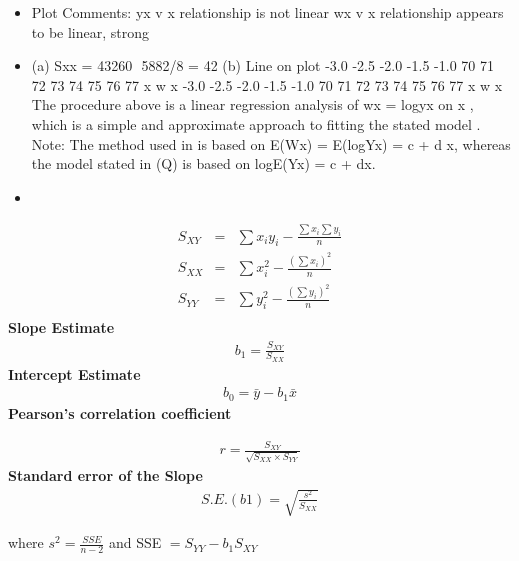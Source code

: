 \documentclass[a4paper,12pt]{article}
\begin{document}
\begin{itemize}
\item Plot
Comments: yx v x relationship is not linear
wx v x relationship appears to be linear, strong
\item (a) Sxx = 43260  5882/8 = 42
(b) Line on plot
-3.0
-2.5
-2.0
-1.5
-1.0
70 71 72 73 74 75 76 77
x
w x
-3.0
-2.5
-2.0
-1.5
-1.0
70 71 72 73 74 75 76 77
x
w x
The procedure above is a linear regression analysis of wx = logyx on x , which
is a simple and approximate approach to fitting the stated model .
Note: The method used in  is based on E(Wx) = E(logYx) = c + d x, whereas
the model stated in (Q) is based on logE(Yx) = c + dx.
    \item 
\end{itemize}


\newpage


\begin{eqnarray*}
	S_{XY} &=&
	\sum x_iy_i - \frac{\sum x_i\sum y_i}{n}\\
	S_{XX} &=&
	\sum x_i^2 - \frac{(\sum x_i)^2}{n}\\
	S_{YY} &=&
	\sum y_i^2 - \frac{(\sum y_i)^2}{n}\\
\end{eqnarray*}
{\bf Slope Estimate}
\begin{eqnarray*}
	b_1 = \frac{S_{XY}}{S_{XX}}
\end{eqnarray*}
{\bf Intercept Estimate}
\begin{eqnarray*}
	b_0 = \bar{y} -b_1\bar{x}
\end{eqnarray*}
{\bf Pearson's correlation coefficient}

\begin{eqnarray*}
	r = \frac{S_{XY}}{\sqrt{S_{XX} \times S_{YY}}}
\end{eqnarray*}
{\bf Standard error of the Slope}
\begin{eqnarray*}
	S.E.(b1) = \sqrt{\frac{s^2}{S_{XX}}}
\end{eqnarray*}

where $s^2 = \frac{SSE}{n-2}$
and SSE $= S_{YY} - b_1S_{XY}$
\end{document}
